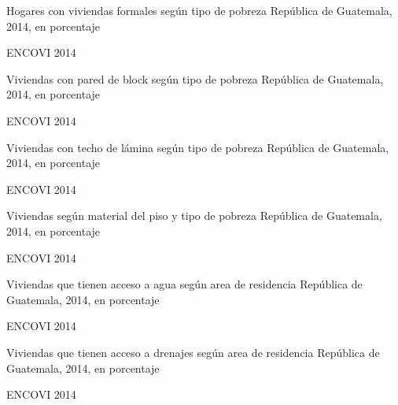 
{%
 }%
{%
 Hogares con viviendas formales según tipo de pobreza} %
{%
 República de Guatemala, 2014, en porcentaje} %
{%
 \begin{tikzpicture}[x=1pt,y=1pt]    \end{tikzpicture}}%
{%
 ENCOVI 2014} %


%
{%
}%
{%
	Viviendas con pared de block según tipo de pobreza} %
{%
	República de Guatemala, 2014, en porcentaje} %
{%
	\begin{tikzpicture}[x=1pt,y=1pt]    \end{tikzpicture}}%
{%
	ENCOVI 2014} %


%
{%
}%
{%
	Viviendas con techo de lámina  según tipo de pobreza} %
{%
	República de Guatemala, 2014, en porcentaje} %
{%
	\begin{tikzpicture}[x=1pt,y=1pt]    \end{tikzpicture}}%
{%
	ENCOVI 2014} %


%
{%
}%
{%
	Viviendas según material del piso y tipo de pobreza} %
{%
	República de Guatemala, 2014, en porcentaje} %
{%
	\begin{tikzpicture}[x=1pt,y=1pt]    \end{tikzpicture}}%
{%
	ENCOVI 2014} %


%
{%
}%
{%
	Viviendas que tienen acceso a agua según area de residencia} %
{%
	República de Guatemala, 2014, en porcentaje} %
{%
	\begin{tikzpicture}[x=1pt,y=1pt]    \end{tikzpicture}}%
{%
	ENCOVI 2014} %



%
{%
}%
{%
	Viviendas que tienen acceso a drenajes según area de residencia} %
{%
	República de Guatemala, 2014, en porcentaje} %
{%
	\begin{tikzpicture}[x=1pt,y=1pt]    \end{tikzpicture}}%
{%
	ENCOVI 2014} %

